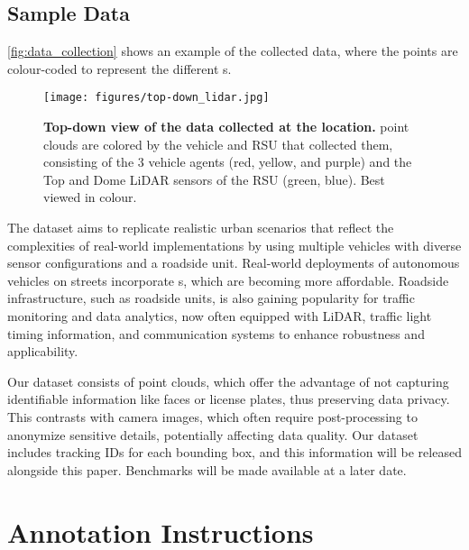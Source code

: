 \subsection{Sample Data}
\autoref{fig:data_collection} shows an example of the collected data, where the points are colour-coded to represent the different {\lidar}s. %
%
\begin{figure}[h!]
\centering
\texttt{[image: figures/top-down\_lidar.jpg]}
\caption{\textbf{Top-down view of the data collected at the location.} \lidar point clouds are colored by the vehicle and RSU that collected them, consisting of the 3 vehicle agents ({\color{red}red}, {\color{Goldenrod}yellow}, and {\color{Purple}purple}) and the Top and Dome LiDAR sensors of the RSU ({\color{ForestGreen}green}, {\color{blue}blue}). Best viewed in colour.}
\label{fig:data_collection}
\end{figure}
%
The dataset aims to replicate realistic urban scenarios that reflect the complexities of real-world implementations by using multiple vehicles with diverse sensor configurations and a roadside unit. 
Real-world deployments of autonomous vehicles on streets incorporate {\lidar}s, which are becoming more affordable. Roadside infrastructure, such as roadside units, is also gaining popularity for traffic monitoring and data analytics, now often equipped with LiDAR, traffic light timing information, and communication systems to enhance robustness and applicability.

Our dataset consists of \lidar point clouds, which offer the advantage of not capturing identifiable information like faces or license plates, thus preserving data privacy. This contrasts with camera images, which often require post-processing to anonymize sensitive details, potentially affecting data quality. Our dataset includes tracking IDs for each bounding box, and this information will be released alongside this paper. Benchmarks will be made available at a later date.
%

\section{Annotation Instructions}

